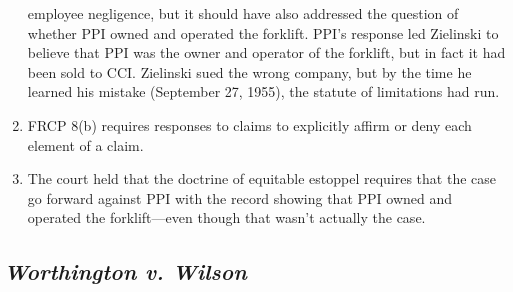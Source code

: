 \begin{enumerate}
    employee negligence, but it should have also addressed the question of 
    whether PPI owned and operated the forklift. PPI's response led Zielinski 
    to believe that PPI was the owner and operator of the forklift, but in 
    fact it had been sold to CCI. Zielinski sued the wrong company, but by the 
    time he learned his mistake (September 27, 1955), the statute of 
    limitations had run.
    \item FRCP 8(b) requires responses to claims to explicitly affirm or deny 
    each element of a claim.
    \item The court held that the doctrine of equitable estoppel requires that 
    the case go forward against PPI with the record showing that PPI owned and 
    operated the forklift---even though that wasn't actually the case.
\end{enumerate}

% 

\subsection{\emph{Worthington v. Wilson}}

